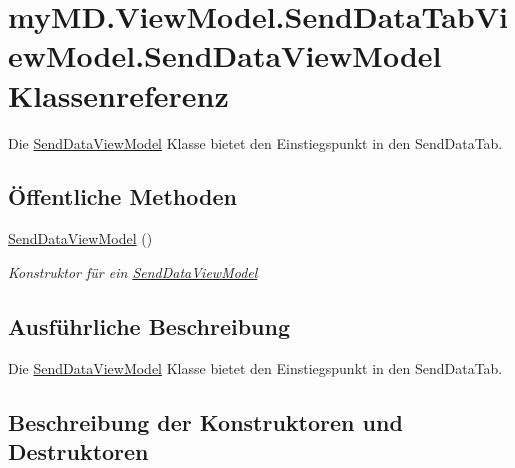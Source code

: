 \hypertarget{classmy_m_d_1_1_view_model_1_1_send_data_tab_view_model_1_1_send_data_view_model}{}\section{my\+M\+D.\+View\+Model.\+Send\+Data\+Tab\+View\+Model.\+Send\+Data\+View\+Model Klassenreferenz}
\label{classmy_m_d_1_1_view_model_1_1_send_data_tab_view_model_1_1_send_data_view_model}


Die \mbox{\hyperlink{classmy_m_d_1_1_view_model_1_1_send_data_tab_view_model_1_1_send_data_view_model}{Send\+Data\+View\+Model}} Klasse bietet den Einstiegspunkt in den Send\+Data\+Tab.  


\subsection*{Öffentliche Methoden}
\begin{DoxyCompactItemize}
\item 
\mbox{\hyperlink{classmy_m_d_1_1_view_model_1_1_send_data_tab_view_model_1_1_send_data_view_model_abdf1a8159aac4d3f726a307fc37ca6b6}{Send\+Data\+View\+Model}} ()
\begin{DoxyCompactList}\small\item\em Konstruktor für ein \mbox{\hyperlink{classmy_m_d_1_1_view_model_1_1_send_data_tab_view_model_1_1_send_data_view_model}{Send\+Data\+View\+Model}} \end{DoxyCompactList}\end{DoxyCompactItemize}


\subsection{Ausführliche Beschreibung}
Die \mbox{\hyperlink{classmy_m_d_1_1_view_model_1_1_send_data_tab_view_model_1_1_send_data_view_model}{Send\+Data\+View\+Model}} Klasse bietet den Einstiegspunkt in den Send\+Data\+Tab. 



\subsection{Beschreibung der Konstruktoren und Destruktoren}
\mbox{\label{classmy_m_d_1_1_view_model_1_1_send_data_tab_view_model_1_1_send_data_view_model_abdf1a8159aac4d3f726a307fc37ca6b6}} 

